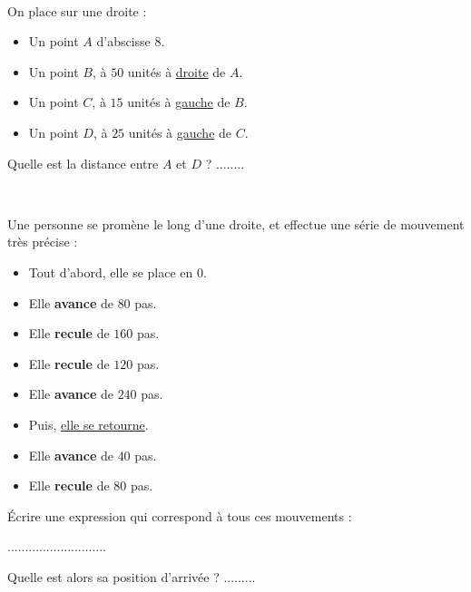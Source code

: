 \documentclass[a4paper,12pt]{article}
\newcommand{\exerciceEspacement}{0.6em}
\begin{document}
\vspace{\exerciceEspacement}

\begin{exercice}\

	On place sur une droite :
	\begin{itemize}
		\item Un point $A$ d'abscisse $8$.
		\item Un point $B$, à $50$ unités à \uline{droite} de $A$.
		\item Un point $C$, à $15$ unités à \uline{gauche} de $B$.
		\item Un point $D$, à $25$ unités à \uline{gauche} de $C$.
	\end{itemize}


	Quelle est la distance entre $A$ et $D$ ? ........
\end{exercice}

\vspace{\exerciceEspacement}

\begin{exercice}\

	Une personne se promène le long d'une droite, et effectue une série de mouvement très précise :

	\begin{itemize}
		\item Tout d'abord, elle se place en $0$.
		\item Elle \textbf{avance} de $80$ pas.
		\item Elle \textbf{recule} de $160$ pas.
		\item Elle \textbf{recule} de $120$ pas.
		\item Elle \textbf{avance} de $240$ pas.
		\item Puis, \uline{elle se retourne}.
		\item Elle \textbf{avance} de $40$ pas.
		\item Elle \textbf{recule} de $80$ pas.
	\end{itemize}

	Écrire une expression qui correspond à tous ces mouvements :
	\vspace{0.4em}
	\begin{center}
		............................
	\end{center}
	\vspace{0.4em}

	Quelle est alors sa position d'arrivée ? .........
\end{exercice}
\end{document}
